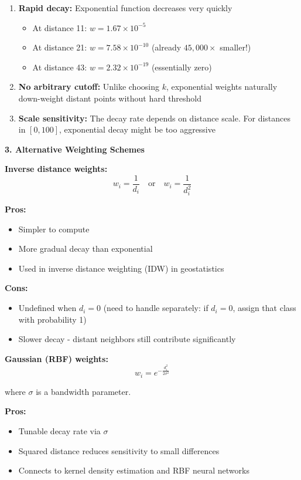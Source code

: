 \documentclass[12pt]{article}
\begin{document}
\begin{explanation}
\begin{enumerate}
    \item \textbf{Rapid decay:} Exponential function decreases very quickly
    \begin{itemize}
        \item At distance 11: \(w = 1.67 \times 10^{-5}\)
        \item At distance 21: \(w = 7.58 \times 10^{-10}\) (already \(45,000\times\) smaller!)
        \item At distance 43: \(w = 2.32 \times 10^{-19}\) (essentially zero)
    \end{itemize}

    \item \textbf{No arbitrary cutoff:} Unlike choosing \(k\), exponential weights naturally down-weight distant points without hard threshold

    \item \textbf{Scale sensitivity:} The decay rate depends on distance scale. For distances in \([0, 100]\), exponential decay might be too aggressive
\end{enumerate}

\textbf{3. Alternative Weighting Schemes}

\textbf{Inverse distance weights:}
\[
w_i = \frac{1}{d_i} \quad \text{or} \quad w_i = \frac{1}{d_i^2}
\]

\textbf{Pros:}
\begin{itemize}
    \item Simpler to compute
    \item More gradual decay than exponential
    \item Used in inverse distance weighting (IDW) in geostatistics
\end{itemize}

\textbf{Cons:}
\begin{itemize}
    \item Undefined when \(d_i = 0\) (need to handle separately: if \(d_i = 0\), assign that class with probability 1)
    \item Slower decay - distant neighbors still contribute significantly
\end{itemize}

\textbf{Gaussian (RBF) weights:}
\[
w_i = e^{-\frac{d_i^2}{2\sigma^2}}
\]

where \(\sigma\) is a bandwidth parameter.

\textbf{Pros:}
\begin{itemize}
    \item Tunable decay rate via \(\sigma\)
    \item Squared distance reduces sensitivity to small differences
    \item Connects to kernel density estimation and RBF neural networks
\end{itemize}


\end{explanation}
\end{document}
